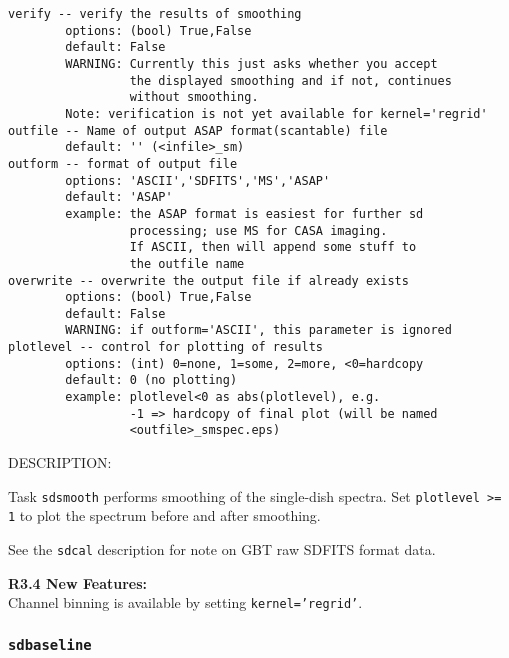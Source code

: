 \begin{verbatim}
verify -- verify the results of smoothing
        options: (bool) True,False
        default: False
        WARNING: Currently this just asks whether you accept
                 the displayed smoothing and if not, continues
                 without smoothing.
        Note: verification is not yet available for kernel='regrid'
outfile -- Name of output ASAP format(scantable) file
        default: '' (<infile>_sm)
outform -- format of output file
        options: 'ASCII','SDFITS','MS','ASAP'
        default: 'ASAP'
        example: the ASAP format is easiest for further sd
                 processing; use MS for CASA imaging.
                 If ASCII, then will append some stuff to
                 the outfile name
overwrite -- overwrite the output file if already exists
        options: (bool) True,False
        default: False
        WARNING: if outform='ASCII', this parameter is ignored
plotlevel -- control for plotting of results
        options: (int) 0=none, 1=some, 2=more, <0=hardcopy
        default: 0 (no plotting)
        example: plotlevel<0 as abs(plotlevel), e.g.
                 -1 => hardcopy of final plot (will be named
                 <outfile>_smspec.eps)
\end{verbatim}

    DESCRIPTION:

Task {\tt sdsmooth} performs smoothing of the single-dish spectra.
Set {\tt plotlevel >= 1} to plot the spectrum before and after smoothing.
    
See the {\tt sdcal} description for note on GBT raw SDFITS format data.

\medskip
{\bf R3.4 New Features:}\\
Channel binning is available by setting {\tt kernel='regrid'}.

 
\subsubsection{{\tt sdbaseline}}
\label{section:sd.sdtasks.tasks.sdbaseline}

